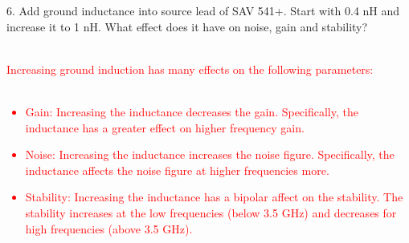 \documentclass[conference]{IEEEtran}
\begin{document}
6. Add ground inductance into source lead of SAV 541+. Start with 0.4 nH and increase it to 1 nH. What effect does it have on noise, gain and stability?\\\\
\textcolor{red}{Increasing ground induction has many effects on the following parameters:\\\\
\begin{itemize}
\item Gain: Increasing the inductance decreases the gain.  Specifically, the inductance has a greater effect on higher frequency gain.
\item Noise: Increasing the inductance increases the noise figure.  Specifically, the inductance affects the noise figure at higher frequencies more.
\item Stability: Increasing the inductance has a bipolar affect on the stability.  The stability increases at the low frequencies (below 3.5 GHz) and decreases for high frequencies (above 3.5 GHz).
\end{itemize}}
\end{document}

